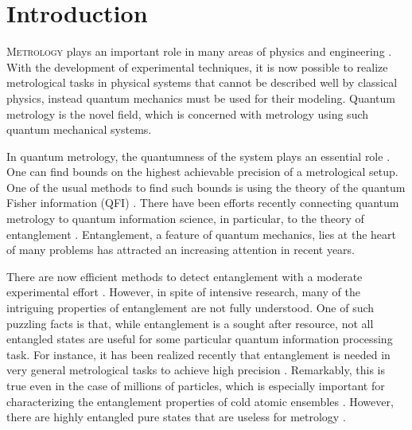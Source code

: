 \section{Introduction}


\lettrine[lines=2, findent=3pt,nindent=0pt]{M}{etrology} plays an important role in many areas of physics and engineering \cite{Glaser2010}.
With the development of experimental techniques, it is now possible to realize metrological tasks in physical systems that cannot be described well by classical physics, instead quantum mechanics must be used for their modeling.
Quantum metrology \cite{Giovannetti2004, Giovannetti2006, Paris2009, Gross2012} is the novel field, which is concerned with metrology using such quantum mechanical systems.

In quantum metrology, the quantumness of the system plays an essential role \cite{Demkowicz-Dobrzanski2015, Pezze2014}.
One can find bounds on the highest achievable precision of a metrological setup.
One of the usual methods to find such bounds is using the theory of the quantum Fisher information (QFI) \cite{Helstrom1969, Holevo1982, Braunstein1996, Petz2008}.
There have been efforts recently connecting quantum metrology to quantum information science, in particular, to the theory of entanglement \cite{Toth2010}.
Entanglement, a feature of quantum mechanics, lies at the heart of many problems has attracted an increasing attention in recent years.

There are now efficient methods to detect entanglement with a moderate experimental effort \cite{Horodecki2009, Guehne2009}.
However, in spite of intensive research, many of the intriguing properties of entanglement are not fully understood.
One of such puzzling facts is that, while entanglement is a sought after resource, not all entangled states are useful for some particular quantum information processing task.
For instance, it has been realized recently that entanglement is needed in very general metrological tasks to achieve high precision \cite{Pezze2009}.
Remarkably, this is true even in the case of millions of particles, which is especially important for characterizing the entanglement properties of cold atomic ensembles \cite{Louchet-Chauvet2010, Appel2009, Riedel2010, Gross2010, Luecke2011, Strobel2014}.
However, there are highly entangled pure states that are useless for metrology \cite{Hyllus2010}.

